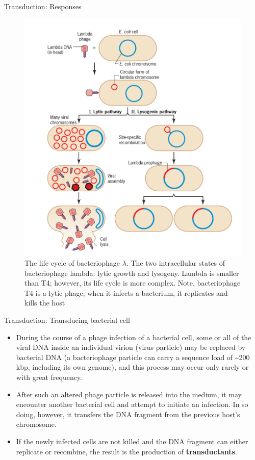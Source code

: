 \documentclass[
  ignorenonframetext,
  aspectratio=169]{beamer}
\providecommand{\tightlist}{%
  \setlength{\itemsep}{0pt}\setlength{\parskip}{0pt}}
\begin{document}
\begin{frame}{Transduction: Responses}
\protect\hypertarget{transduction-responses}{}
\begin{figure}
\includegraphics[width=0.32\linewidth]{./../images/bacteriophage_stages} \caption{The life cycle of bacteriophage $\lambda$. The two intracellular states of bacteriophage lambda: lytic growth and lysogeny. Lambda is smaller than T4; however, its life cycle is more complex. Note, bacteriophage T4 is a lytic phage; when it infects a bacterium, it replicates and kills the host}\label{fig:transduction-bacteriophage}
\end{figure}
\end{frame}

\begin{frame}{Transduction: Transducing bacterial cell}
\protect\hypertarget{transduction-transducing-bacterial-cell}{}
\begin{itemize}
\tightlist
\item
  During the course of a phage infection of a bacterial cell, some or
  all of the viral DNA inside an individual virion (virus particle) may
  be replaced by bacterial DNA (a bacteriophage particle can carry a
  sequence load of \textasciitilde200 kbp, including its own genome),
  and this process may occur only rarely or with great frequency.
\item
  After such an altered phage particle is released into the medium, it
  may encounter another bacterial cell and attempt to initiate an
  infection. In so doing, however, it transfers the DNA fragment from
  the previous host's chromosome.
\item
  If the newly infected cells are not killed and the DNA fragment can
  either replicate or recombine, the result is the production of
  \textbf{transductants}.
\end{itemize}
\end{frame}
\end{document}
